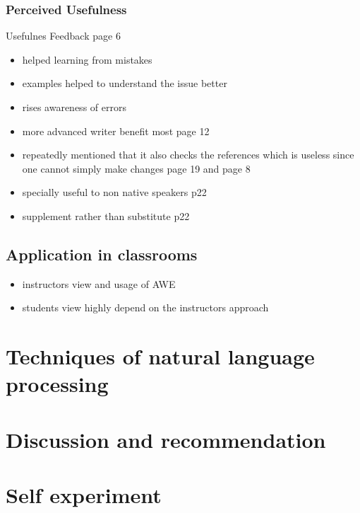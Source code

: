 \documentclass[runningheads]{llncs}
\begin{document}
\subsubsection{Perceived Usefulness} 
Usefulnes Feedback \citep{nova_utilizing_2018} page 6 
\begin{itemize}
    \item helped learning from mistakes
    \item examples helped to understand the issue better
    \item rises awareness of errors
    \item more advanced writer benefit most \citep{cavaleri_you_2016} page 12
    \item repeatedly mentioned that it also checks the references which is useless since one cannot simply make changes \citep{ventayen_graduate_2018} page 19 and \citep{nova_utilizing_2018} page 8
    \item specially useful to non native speakers \citep{ventayen_graduate_2018} p22
    \item supplement rather than substitute \citep{ventayen_graduate_2018} p22
\end{itemize}

\subsection{Application in classrooms}
\cite{li_rethinking_2015}
\begin{itemize}
 \item instructors view and usage of AWE
 \item students view highly depend on the instructors approach
\end{itemize}


\section{Techniques of natural language processing}

\section{Discussion and recommendation}











\section{Self experiment}
\end{document}
